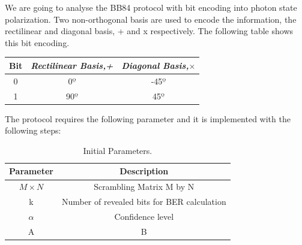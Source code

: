 We are going to analyse the BB84 protocol with bit encoding into photon state polarization. Two non-orthogonal basis are used to encode the information, the rectilinear and diagonal basis, + and x respectively. The following table shows this bit encoding.
\begin{table}[H]
	\centering
	\begin{tabular}{c|c|c}
		 Bit &  \textit{Rectilinear Basis,+} & \textit{Diagonal Basis,$\times$}\\ \hline
		0 &  0$º$ & -45$º$ \\
		1 & 90$º$ & 45$º$\\
	\end{tabular}
\end{table}

The protocol requires the following parameter and it is implemented with the following steps:

\begin{table}[hbt]
	\centering
	\caption{Initial Parameters.}
	\label{tb:param}
	\begin{tabular}{|c|c|}
		\hline
		\textbf{Parameter}  & \textbf{Description} 	   \\ \hline
			$M \times N$    & Scrambling Matrix M by N \\ \hline
			k				& Number of revealed bits for BER calculation \\ \hline
			$\alpha$        & Confidence level 	       \\ \hline
			    A    & B                \\ \hline
	\end{tabular}
\end{table}

